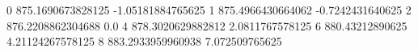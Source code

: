 0 875.1690673828125 -1.05181884765625
1 875.4966430664062 -0.7242431640625
2 876.2208862304688 0.0
4 878.3020629882812 2.0811767578125
6 880.43212890625 4.21124267578125
8 883.2933959960938 7.072509765625
